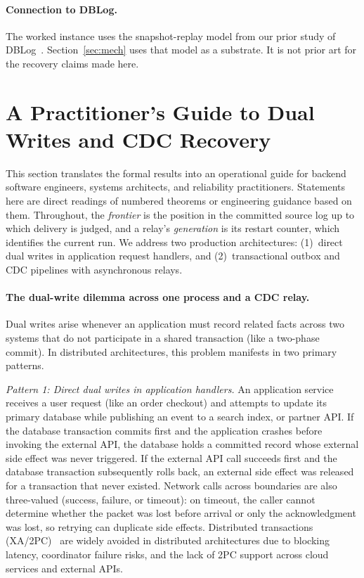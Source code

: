 \documentclass[sigplan,10pt]{acmart}
\theoremstyle{plain}
\theoremstyle{definition}
\begin{document}
\paragraph{Connection to DBLog.}
The worked instance uses the snapshot-replay model from our prior
study of DBLog~\cite{own-arxiv}. Section~\ref{sec:mech} uses that model
as a substrate. It is not prior art for the recovery claims made here.

\section{A Practitioner's Guide to Dual Writes and CDC Recovery}\label{sec:practitioner}

This section translates the formal results into an operational guide for
backend software engineers, systems architects, and reliability practitioners.
Statements here are direct readings of numbered theorems or engineering
guidance based on them.
Throughout, the \emph{frontier} is the position in the committed source
log up to which delivery is judged, and a relay's \emph{generation} is
its restart counter, which identifies the current run.
We address two production architectures:
(1)~direct dual writes in application request handlers, and
(2)~transactional outbox and CDC pipelines with asynchronous relays.

\paragraph{The dual-write dilemma across one process and a CDC relay.}
Dual writes arise whenever an application must record related facts across
two systems that do not participate in a shared transaction (like a two-phase commit). 
In distributed architectures, this problem manifests in two primary patterns.

\emph{Pattern 1: Direct dual writes in application handlers.}
An application service receives a user request (like an order checkout)
and attempts to update its primary database while publishing an event to a search index, or partner API.
If the database transaction commits first and the application crashes before
invoking the external API, the database holds a committed record whose external
side effect was never triggered.
If the external API call succeeds first and the database transaction
subsequently rolls back, an external side effect was released for a transaction
that never existed.
Network calls across boundaries are also three-valued (success,
failure, or timeout): on timeout, the caller cannot determine whether the
packet was lost before arrival or only the acknowledgment was lost, so
retrying can duplicate side effects. Distributed transactions
(XA/2PC)~\cite{gray78} are widely avoided in distributed architectures due to
blocking latency, coordinator failure risks, and the lack of 2PC
support across cloud services and external APIs.
\end{document}
